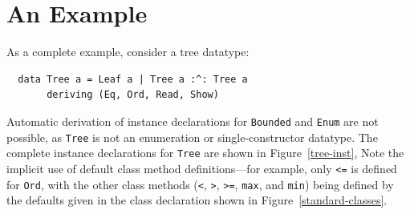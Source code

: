 %


\section{An Example}

As a complete example, consider a tree datatype:\nopagebreak
\bprog
{\small\begin{verbatim}
  data Tree a = Leaf a | Tree a :^: Tree a
       deriving (Eq, Ord, Read, Show)
\end{verbatim}}
\eprog
Automatic derivation of
instance
declarations for \mbox{\tt Bounded} and \mbox{\tt Enum} are not possible, as \mbox{\tt Tree} is not
an enumeration or single-constructor datatype.  The complete
instance declarations for \mbox{\tt Tree} are shown in Figure~\ref{tree-inst},
Note the implicit use of default class method
definitions---for
example, only \mbox{\tt <=} is defined for \mbox{\tt Ord}, with the other
class methods (\mbox{\tt <}, \mbox{\tt >}, \mbox{\tt >=}, \mbox{\tt max}, and \mbox{\tt min}) being defined by the defaults given in
the class declaration shown in Figure~\ref{standard-classes}.

